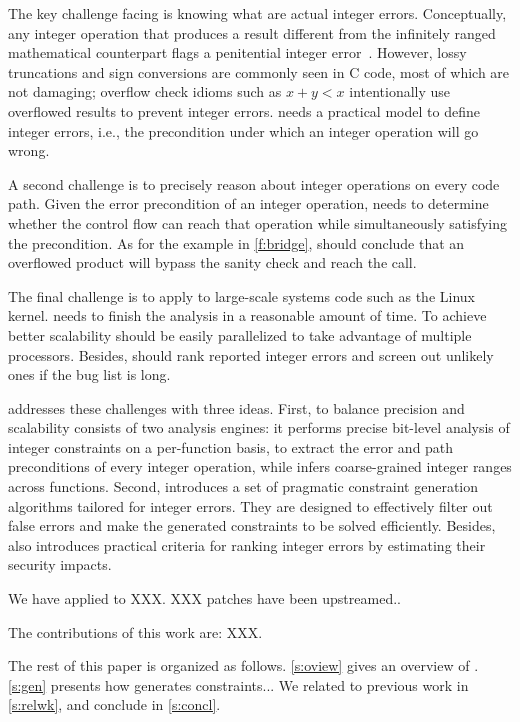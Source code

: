 The key challenge facing \sys is knowing what are actual integer
errors.  Conceptually, any integer operation that produces a result
different from the infinitely ranged mathematical counterpart flags
a penitential integer error~\cite{air}.  However, lossy truncations
and sign conversions are commonly seen in C code, most of which are
not damaging; overflow check idioms such as $x + y < x$ intentionally
use overflowed results to prevent integer errors.  \sys needs a
practical model to define integer errors, i.e., the precondition
under which an integer operation will go wrong.

A second challenge is to precisely reason about integer operations
on every code path.  Given the error precondition of an integer
operation, \sys needs to determine whether the control flow can
reach that operation while simultaneously satisfying the precondition.
As for the example in \autoref{f:bridge}, \sys should conclude that
an overflowed product  will bypass the sanity check and
reach the  call.

The final challenge is to apply \sys to large-scale systems code
such as the Linux kernel.  \sys needs to finish the analysis in a
reasonable amount of time.  To achieve better scalability \sys
should be easily parallelized to take advantage of multiple processors.
Besides, \sys should rank reported integer errors and screen out
unlikely ones if the bug list is long.

\sys addresses these challenges with three ideas.  First, to balance
precision and scalability \sys consists of two analysis engines:
it performs precise bit-level analysis of integer constraints on a
per-function basis, to extract the error and path preconditions of
every integer operation, while infers coarse-grained integer ranges
across functions.  Second, \sys introduces a set of pragmatic
constraint generation algorithms tailored for integer errors.  They
are designed to effectively filter out false errors and make the
generated constraints to be solved efficiently.  Besides, \sys also
introduces practical criteria for ranking integer errors by estimating
their security impacts.

We have applied \sys to XXX.  XXX patches have been upstreamed..

The contributions of this work are: XXX.

The rest of this paper is organized as follows. \autoref{s:oview}
gives an overview of \sys.  \autoref{s:gen} presents how \sys
generates constraints...  We related \sys to previous work in
\autoref{s:relwk}, and conclude in \autoref{s:concl}.
